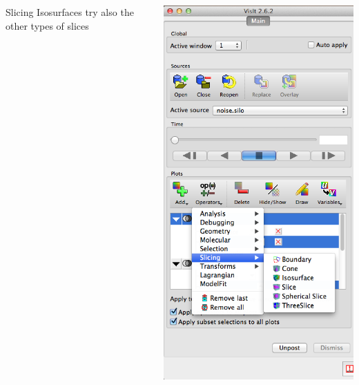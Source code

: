 \begin{frame}
\begin{columns}
\begin{column}{8cm}
\begin{beamerboxesrounded}[upper=block head,lower=block body,shadow=true]{Slicing Isosurfaces}
	\hspace{3.5mm}
		try also the other types of slices
\end{beamerboxesrounded}
\end{column}
\begin{column}{3.5cm}
	\includegraphics[width=\columnwidth]{figs/visit-pract/VisIt_sliceIsosurf}
\end{column}
\end{columns}
\end{frame}


